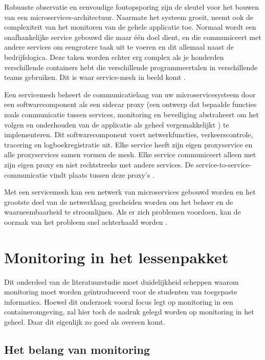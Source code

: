Robuuste observatie en eenvoudige foutopsporing zijn de sleutel voor het bouwen van een microservices-architectuur. Naarmate het systeem groeit, neemt ook de complexiteit van het monitoren van de gehele applicatie toe. Normaal wordt een onafhankelijke service gebouwd die maar één doel dient, en die communiceert met andere services om een ​​grotere taak uit te voeren en dit allemaal naast de bedrijfslogica. Deze taken worden echter erg complex als je honderden verschillende containers hebt die verschillende programmeertalen in verschillende teams gebruiken. Dit is waar service-mesh in beeld komt \autocite{AWS2021}. 

Een servicemesh beheert de communicatielaag van uw microservicesysteem door een softwarecomponent als een sidecar proxy (een ontwerp dat bepaalde functies zoals communicatie tussen services, monitoring en beveiliging abstraheert om het volgen en onderhouden van de applicatie als geheel vergemakkelijkt \autocite{Gilles2019}) te implementeren. Dit softwarecomponent voert netwerkfuncties, verkeerscontrole, tracering en logboekregistratie uit. Elke service heeft zijn eigen proxyservice en alle proxyservices samen vormen de mesh. Elke service communiceert alleen met zijn eigen proxy en niet rechtstreeks met andere services. De service-to-service-communicatie vindt plaats tussen deze proxy's \autocite{AWS2021}. 

Met een servicemesh kan een netwerk van microservices gebouwd worden en het grootste deel van de netwerklaag gescheiden worden om het beheer en de waarneembaarheid te stroomlijnen. Als er zich problemen voordoen, kan de oorzaak van het probleem snel achterhaald worden \autocite{AWS2021}.

\section{Monitoring in het lessenpakket}

Dit onderdeel van de literatuurstudie moet duidelijkheid scheppen waarom monitoring moet worden geïntroduceerd voor de studenten van toegepaste informatica. Hoewel dit onderzoek vooral focus legt op monitoring in een containeromgeving, zal hier toch de nadruk gelegd worden op monitoring in het geheel. Daar dit eigenlijk zo goed als overeen komt.

\subsection{Het belang van monitoring}

